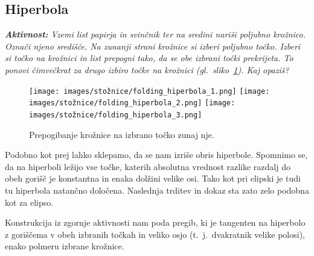 \subsection{Hiperbola}

\textit{\textbf{Aktivnost:} Vzemi list papirja in svinčnik ter na sredini nariši poljubno krožnico. Označi njeno središče. Na zunanji strani krožnice si izberi poljubno točko. Izberi si točko na krožnici in list prepogni tako, da se obe izbrani točki prekrijeta. To ponovi čimvečkrat za drugo izbiro točke na krožnici (gl.\ sliko~\ref{fig:koraki_hiperbola}). Kaj opaziš?}

\begin{figure}[h]
    \centering
    \texttt{[image: images/stožnice/folding\_hiperbola\_1.png]}
    \texttt{[image: images/stožnice/folding\_hiperbola\_2.png]}
    \texttt{[image: images/stožnice/folding\_hiperbola\_3.png]}
    \caption[Prepogibanje hiperbole]{Prepogibanje krožnice na izbrano točko zunaj nje.}
    \label{fig:koraki_hiperbola}
\end{figure}

Podobno kot prej lahko sklepamo, da se nam izriše obris hiperbole. Spomnimo se, da na hiperboli ležijo vse točke, katerih absolutna vrednost razlike razdalj do obeh gorišč je konstantna in enaka dolžini velike osi. Tako kot pri elipski je tudi tu hiperbola natančno določena. Naslednja trditev in dokaz sta zato zelo podobna kot za elipso.

\begin{trditev}
    Konstrukcija iz zgornje aktivnosti nam poda pregib, ki je tangenten na hiperbolo z goriščema v obeh izbranih točkah in veliko osjo (t.\ j.\ dvakratnik velike polosi), enako polmeru izbrane krožnice.
\end{trditev}

